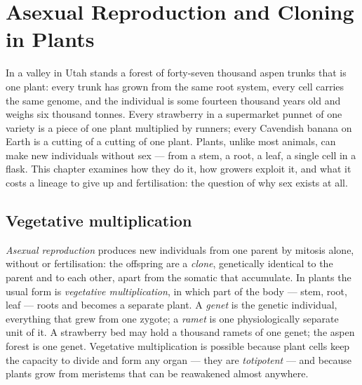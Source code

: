 \chapter{Asexual Reproduction and Cloning in Plants}\label{ch:b2:asexual-reproduction}

In a valley in Utah stands a forest of forty-seven thousand aspen
trunks that is one plant: every trunk has grown from the same root
system, every cell carries the same genome, and the individual is
some fourteen thousand years old and weighs six thousand tonnes.
Every strawberry in a supermarket punnet of one variety is a piece
of one plant multiplied by runners; every Cavendish banana on Earth
is a cutting of a cutting of one plant. Plants, unlike most animals,
can make new individuals without sex --- from a stem, a root, a leaf,
a single cell in a flask. This chapter examines how they do it, how
growers exploit it, and what it costs a lineage to give up 
and fertilisation: the question of why sex exists at all.

\section{Vegetative multiplication}

\begin{definition}\label{def:b2:asexual-reproduction:clone}
\emph{Asexual reproduction} produces new individuals from one parent
by mitosis alone, without  or fertilisation: the offspring
are a \emph{clone}, genetically identical to the parent and to each
other, apart from the somatic  that accumulate. In plants
the usual form is \emph{vegetative multiplication}, in which part of
the body --- stem, root, leaf --- roots and becomes a separate plant.
A \emph{genet} is the genetic individual, everything that grew from
one zygote; a \emph{ramet} is one physiologically separate unit of
it. A strawberry bed may hold a thousand ramets of one genet; the
aspen forest is one genet. Vegetative multiplication is possible
because plant cells keep the capacity to divide and form any organ
--- they are \emph{totipotent} --- and because plants grow from
meristems that can be reawakened almost anywhere.
\end{definition}

